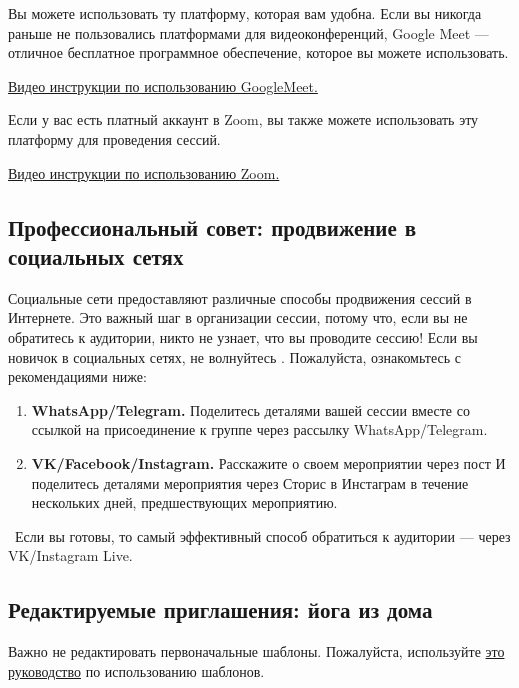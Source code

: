 Вы можете использовать ту платформу, которая вам удобна. Если вы никогда раньше не пользовались платформами для видеоконференций, Google Meet — отличное бесплатное программное обеспечение, которое вы можете использовать. 

\href{https://drive.google.com/file/d/1aqEODSOCmS3BdFkcbs-sf_Aa1cjpd37d/view?usp=sharing}{Видео инструкции по использованию GoogleMeet.}

Если у вас есть платный аккаунт в Zoom, вы также можете использовать эту платформу для проведения сессий.

\href{https://drive.google.com/file/d/10llvQ_0aU7aWvye_Qvgj59LNMaya3aF8/view?usp=sharing}{Видео инструкции по использованию Zoom.}

\subsection*{Профессиональный совет: продвижение в социальных сетях}
\label{sec:profAdv2}

Социальные сети предоставляют различные способы продвижения сессий в Интернете. Это важный шаг в организации сессии, потому что, если вы не обратитесь к аудитории, никто не узнает, что вы проводите сессию!
Если вы новичок в социальных сетях, не волнуйтесь \faSmileO. Пожалуйста, ознакомьтесь с рекомендациями ниже:
\begin{enumerate}
    \item \textbf{WhatsApp/Telegram.} Поделитесь деталями вашей сессии вместе со ссылкой на присоединение к группе через рассылку WhatsApp/Telegram.
    \item \textbf{VK/Facebook/Instagram.} Расскажите о своем мероприятии через пост И поделитесь деталями мероприятия через Сторис в Инстаграм в течение нескольких дней, предшествующих мероприятию.
\end{enumerate}


\faLightbulbO\ Если вы готовы, то самый эффективный способ обратиться к аудитории — через VK/Instagram Live.

\subsection*{Редактируемые приглашения: йога из дома}
\label{sec:invites}
Важно не редактировать первоначальные шаблоны. Пожалуйста, используйте \hyperref[sec:templates]{это руководство} по использованию шаблонов. 

